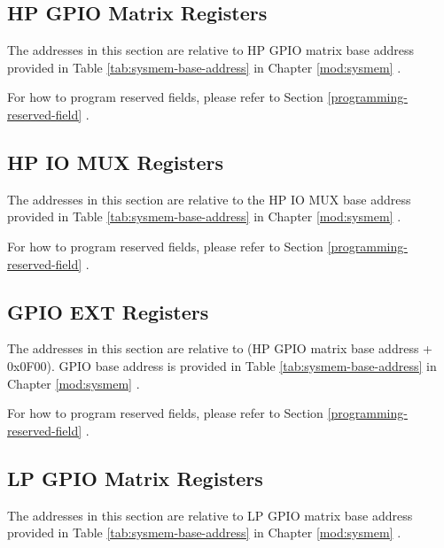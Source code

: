 \documentclass[main\_\_EN.tex]{subfiles}
\begin{document}
\subsection{HP GPIO Matrix Registers}
The addresses in this section are relative to HP GPIO matrix base address provided in Table \ref{tab:sysmem-base-address} in Chapter \ref{mod:sysmem} \textit{}.

For how to program reserved fields, please refer to Section \ref{programming-reserved-field} \textit{}.



\subsection{HP IO MUX Registers}

The addresses in this section are relative to the HP IO MUX base address provided in Table \ref{tab:sysmem-base-address} in Chapter \ref{mod:sysmem} \textit{}.

For how to program reserved fields, please refer to Section \ref{programming-reserved-field} \textit{}.



\subsection{GPIO EXT Registers}

The addresses in this section are relative to (HP GPIO matrix base address + 0x0F00). GPIO base address is provided in Table \ref{tab:sysmem-base-address} in Chapter \ref{mod:sysmem} \textit{}.

For how to program reserved fields, please refer to Section \ref{programming-reserved-field} \textit{}.



\subsection{LP GPIO Matrix Registers}

The addresses in this section are relative to LP GPIO matrix base address provided in Table \ref{tab:sysmem-base-address} in Chapter \ref{mod:sysmem} \textit{}.
\end{document}
